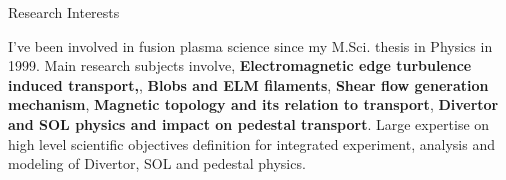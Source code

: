 \begin{cvblock}{Research Interests}
\end{cvblock}
I've been involved in fusion plasma science since my M.Sci. thesis in
Physics in 1999. Main research subjects involve,
\textbf{Electromagnetic edge turbulence induced transport,},
\textbf{Blobs and ELM filaments}, \textbf{Shear flow generation
  mechanism}, \textbf{Magnetic topology and its relation to
  transport}, \textbf{Divertor and SOL physics and   impact on pedestal transport}. Large expertise on high level
scientific objectives definition for integrated experiment, analysis
and modeling  of  Divertor,  SOL and
pedestal physics.

